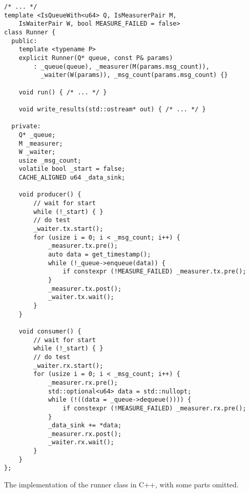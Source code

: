 \begin{listing}
\begin{verbatim}
/* ... */
template <IsQueueWith<u64> Q, IsMeasurerPair M,
    IsWaiterPair W, bool MEASURE_FAILED = false>
class Runner {
  public:
    template <typename P>
    explicit Runner(Q* queue, const P& params)
        : _queue(queue), _measurer(M(params.msg_count)),
          _waiter(W(params)), _msg_count(params.msg_count) {}

    void run() { /* ... */ }

    void write_results(std::ostream* out) { /* ... */ }

  private:
    Q* _queue;
    M _measurer;
    W _waiter;
    usize _msg_count;
    volatile bool _start = false;
    CACHE_ALIGNED u64 _data_sink;

    void producer() {
        // wait for start
        while (!_start) { }
        // do test
        _waiter.tx.start();
        for (usize i = 0; i < _msg_count; i++) {
            _measurer.tx.pre();
            auto data = get_timestamp();
            while (!_queue->enqueue(data)) {
                if constexpr (!MEASURE_FAILED) _measurer.tx.pre();
            }
            _measurer.tx.post();
            _waiter.tx.wait();
        }
    }

    void consumer() {
        // wait for start
        while (!_start) { }
        // do test
        _waiter.rx.start();
        for (usize i = 0; i < _msg_count; i++) {
            _measurer.rx.pre();
            std::optional<u64> data = std::nullopt;
            while (!((data = _queue->dequeue()))) {
                if constexpr (!MEASURE_FAILED) _measurer.rx.pre();
            }
            _data_sink += *data;
            _measurer.rx.post();
            _waiter.rx.wait();
        }
    }
};
\end{verbatim}
\caption{The implementation of the runner class in C++, with some parts omitted.}
\label{fig:runner-class-code}
\end{listing}
